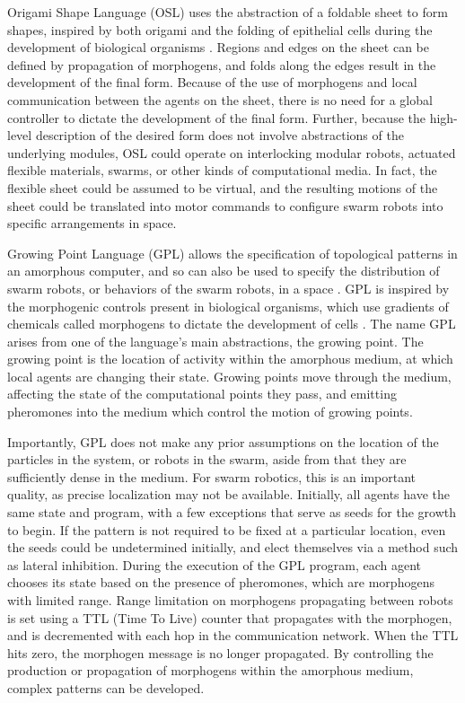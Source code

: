 Origami Shape Language (OSL) uses the abstraction of a foldable sheet to form shapes, inspired by both origami and the folding of epithelial cells during the development of biological organisms \citep{nagpal2004engineering, nagpal2001programmable}.
Regions and edges on the sheet can be defined by propagation of morphogens, and folds along the edges result in the development of the final form.
Because of the use of morphogens and local communication between the agents on the sheet, there is no need for a global controller to dictate the development of the final form. 
Further, because the high-level description of the desired form does not involve abstractions of the underlying modules, OSL could operate on interlocking modular robots, actuated flexible materials, swarms, or other kinds of computational media. 
In fact, the flexible sheet could be assumed to be virtual, and the resulting motions of the sheet could be translated into motor commands to configure swarm robots into specific arrangements in space. 

Growing Point Language (GPL) allows the specification of topological patterns in an amorphous computer, and so can also be used to specify the distribution of swarm robots, or behaviors of the swarm robots, in a space \citep{nagpal2004engineering}. 
GPL is inspired by the morphogenic controls present in biological organisms, which use gradients of chemicals called morphogens to dictate the development of cells \citep{turing1952chemical}.
The name GPL arises from one of the language's main abstractions, the growing point. 
The growing point is the location of activity within the amorphous medium, at which local agents are changing their state. 
Growing points move through the medium, affecting the state of the computational points they pass, and emitting pheromones into the medium which control the motion of growing points.

Importantly, GPL does not make any prior assumptions on the location of the particles in the system, or robots in the swarm, aside from that they are sufficiently dense in the medium. 
For swarm robotics, this is an important quality, as precise localization may not be available. 
Initially, all agents have the same state and program, with a few exceptions that serve as seeds for the growth to begin. 
If the pattern is not required to be fixed at a particular location, even the seeds could be undetermined initially, and elect themselves via a method such as lateral inhibition. 
During the execution of the GPL program, each agent chooses its state based on the presence of pheromones, which are morphogens with limited range. 
Range limitation on morphogens propagating between robots is set using a TTL (Time To Live) counter that propagates with the morphogen, and is decremented with each hop in the communication network. 
When the TTL hits zero, the morphogen message is no longer propagated. 
By controlling the production or propagation of morphogens within the amorphous medium, complex patterns can be developed. 

